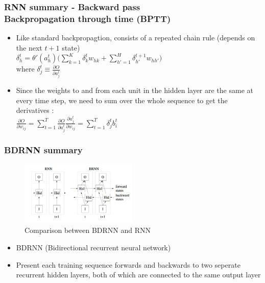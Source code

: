 \documentclass{beamer}
\begin{document}
{
    \frametitle{RNN summary - Backward pass \\ Backpropagation through time (BPTT)}
    \begin{itemize}
        \item Like standard backpropagtion, consists of a repeated chain rule (depends on the next $t+1$ state) \\ 
            \vspace{0.1in}
            $ \delta_h^t = \theta'(a_h^t) \Big( \sum_{k=1}^K \delta_k^t w_{hk} + 
            \sum_{h'=1}^H \delta_{h'}^{t+1} w_{hh'} \Big)$ \\
            \vspace{0.1in}
            where $\delta_j^t \equiv \frac{\partial O}{\partial a_j^t} $
        \item Since the weights to and from each unit in the hidden layer are the same at every time step, 
            we need to sum over the whole sequence to get the derivatives : \\
            \vspace{0.1in}
            $ \frac{\partial O}{\partial w_{ij}} = \sum_{t=1}^T \frac{\partial O}{\partial a_j^t} \frac{\partial a_j^t}{\partial w_{ij}} = \sum_{t=1}^T \delta_j^t b_i^t $
    \end{itemize}
}
\frame
{
    \frametitle{BDRNN summary}
	\begin{figure}[ht]  
		\begin{center}
			\includegraphics[width=2.2in]{Images/BDRNN_RNN.png}   
		\end{center}   
		\caption{Comparison between BDRNN and RNN}
	\end{figure}
    \begin{itemize}
        \item BDRNN (Bidirectional recurrent neural network) 
        \item Present each training sequence forwards and backwards to two seperate recurrent hidden layers, 
            both of which are connected to the same output layer
    \end{itemize}
}
\frame
\end{document}
